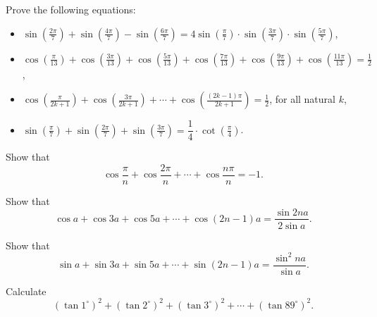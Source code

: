 \documentclass[12pt,a4paper]{memoir}
\theoremstyle{definition}
\begin{document}
\begin{question} Prove the following equations:
	
	\begin{itemize}
		
		\item $\sin \left(\frac{2\pi}{7}\right)+\sin \left(\frac{4\pi}{7}\right) - \sin \left(\frac{6\pi}{7}\right)= 4 \sin \left(\frac{\pi}{7}\right) \cdot \sin \left(\frac{3\pi}{7}\right) \cdot \sin \left(\frac{5\pi}{7}\right)$,
		
		\item $\cos \left(\frac{\pi}{13}\right)+\cos \left(\frac{3\pi}{13}\right)+\cos \left(\frac{5\pi}{13}\right)+\cos \left(\frac{7\pi}{13}\right)+\cos \left(\frac{9\pi}{13}\right)+\cos \left(\frac{11\pi}{13}\right)=\frac12$,
		
		\item $\cos \left(\frac{\pi}{2k+1}\right)+\cos \left(\frac{3\pi}{2k+1}\right)+\cdots +\cos \left(\frac{(2k-1)\pi}{2k+1}\right)=\frac12$, for all natural $k$,
		
		\item $\displaystyle \sin \left(\frac{\pi}{7}\right)+\sin \left(\frac{2\pi}{7}\right)+\sin \left(\frac{3\pi}{7}\right)=\dfrac 14 \cdot \cot \left(\frac{\pi}{4}\right)$.
	\end{itemize}
\end{question}



\begin{question} Show that
	\[\cos \frac{\pi}{n}  + \cos \frac{2 \pi}{n}+ \cdots + \cos \frac{n \pi}{n} = -1.\]
\end{question}



\begin{question}Show that $$\cos a + \cos 3a + \cos 5a + \cdots + \cos(2n - 1)a = \frac{\sin 2na}{2 \sin a}.$$
\end{question}


\begin{question} Show that $$\sin a + \sin 3a + \sin 5a + \cdots + \sin(2n- 1)a = \frac{\sin^2 na}{\sin a}.$$
\end{question}



\begin{question} Calculate
	\[(\tan1^\circ)^2+(\tan2^\circ)^2+(\tan3^\circ)^2+\cdots+(\tan89^\circ)^2.\]
\end{question}
\end{document}
